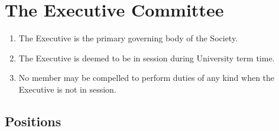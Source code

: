 \documentclass{scrartcl}
\begin{document}
    \clearpage
    \section{The Executive Committee}
        \label{executive}
        \begin{enumerate}
            \item The Executive is the primary governing body of the Society.
            \item The Executive is deemed to be in session during University term time.
            \item No member may be compelled to perform duties of any kind when the Executive is not in session.
        \end{enumerate}

        \subsection{Positions}
            \label{executive--positions}
\end{document}
